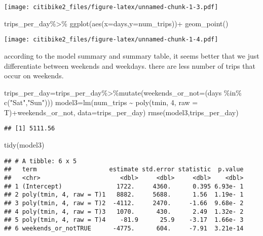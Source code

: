 \documentclass[
]{article}
\newenvironment{Shaded}{\begin{snugshade}}{\end{snugshade}}
\newcommand{\AttributeTok}[1]{\textcolor[rgb]{0.77,0.63,0.00}{#1}}
\newcommand{\DecValTok}[1]{\textcolor[rgb]{0.00,0.00,0.81}{#1}}
\newcommand{\FunctionTok}[1]{\textcolor[rgb]{0.00,0.00,0.00}{#1}}
\newcommand{\NormalTok}[1]{#1}
\newcommand{\OtherTok}[1]{\textcolor[rgb]{0.56,0.35,0.01}{#1}}
\newcommand{\SpecialCharTok}[1]{\textcolor[rgb]{0.00,0.00,0.00}{#1}}
\newcommand{\StringTok}[1]{\textcolor[rgb]{0.31,0.60,0.02}{#1}}
\begin{document}
\texttt{[image: citibike2\_files/figure-latex/unnamed-chunk-1-3.pdf]}

\begin{Shaded}
\begin{Highlighting}[]
\NormalTok{trips\_per\_day}\SpecialCharTok{\%\textgreater{}\%}
  \FunctionTok{ggplot}\NormalTok{(}\FunctionTok{aes}\NormalTok{(}\AttributeTok{x=}\NormalTok{days,}\AttributeTok{y=}\NormalTok{num\_trips))}\SpecialCharTok{+}
  \FunctionTok{geom\_point}\NormalTok{()}
\end{Highlighting}
\end{Shaded}

\texttt{[image: citibike2\_files/figure-latex/unnamed-chunk-1-4.pdf]}

according to the model summary and summary table, it seems better that
we just differentiate between weekends and weekdays. there are less
number of trips that occur on weekends.

\begin{Shaded}
\begin{Highlighting}[]
\NormalTok{trips\_per\_day}\OtherTok{=}\NormalTok{trips\_per\_day}\SpecialCharTok{\%\textgreater{}\%}\FunctionTok{mutate}\NormalTok{(}\AttributeTok{weekends\_or\_not=}\NormalTok{(days }\SpecialCharTok{\%in\%} \FunctionTok{c}\NormalTok{(}\StringTok{"Sat"}\NormalTok{,}\StringTok{"Sun"}\NormalTok{)))}
\NormalTok{model3}\OtherTok{=}\FunctionTok{lm}\NormalTok{(num\_trips }\SpecialCharTok{\textasciitilde{}} \FunctionTok{poly}\NormalTok{(tmin, }\DecValTok{4}\NormalTok{, }\AttributeTok{raw =}\NormalTok{ T)}\SpecialCharTok{+}\NormalTok{weekends\_or\_not, }\AttributeTok{data=}\NormalTok{trips\_per\_day)}
\FunctionTok{rmse}\NormalTok{(model3,trips\_per\_day)}
\end{Highlighting}
\end{Shaded}

\begin{verbatim}
## [1] 5111.56
\end{verbatim}

\begin{Shaded}
\begin{Highlighting}[]
\FunctionTok{tidy}\NormalTok{(model3)}
\end{Highlighting}
\end{Shaded}

\begin{verbatim}
## # A tibble: 6 x 5
##   term                    estimate std.error statistic  p.value
##   <chr>                      <dbl>     <dbl>     <dbl>    <dbl>
## 1 (Intercept)               1722.     4360.      0.395 6.93e- 1
## 2 poly(tmin, 4, raw = T)1   8882.     5688.      1.56  1.19e- 1
## 3 poly(tmin, 4, raw = T)2  -4112.     2470.     -1.66  9.68e- 2
## 4 poly(tmin, 4, raw = T)3   1070.      430.      2.49  1.32e- 2
## 5 poly(tmin, 4, raw = T)4    -81.9      25.9    -3.17  1.66e- 3
## 6 weekends_or_notTRUE      -4775.      604.     -7.91  3.21e-14
\end{verbatim}
\end{document}
